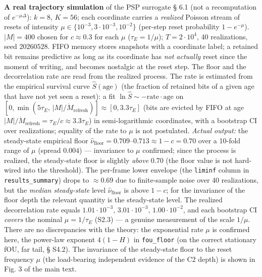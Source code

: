 \documentclass[12pt]{iopart}
\begin{document}
\textbf{A real trajectory simulation} of the PSP surrogate \cite{Andriishin2026b} § 6.1 (not a recomputation of \(e^{-\mu\Delta}\)): \(k = 8\), \(K = 56\); each coordinate carries a \emph{realized} Poisson stream of resets of intensity \(\mu \in \{10^{-3}, 3\cdot10^{-3}, 10^{-2}\}\) (per-step reset probability \(1 - e^{-\mu}\)). \(|M| = 400\) chosen for \(c \approx 0.3\) for each \(\mu\) (\(\tau_E = 1/\mu\)); \(T = 2\cdot10^4\), 40 realizations, seed \(20260528\). FIFO memory stores snapshots with a coordinate label; a retained bit remains predictive as long as its coordinate has \emph{not actually} reset since the moment of writing, and becomes nostalgic at the reset step. The floor and the decorrelation rate are read from the realized process. The rate is estimated from the empirical survival curve \(\hat S(\text{age})\) (the fraction of retained bits of a given age that have not yet seen a reset): a fit \(\ln\hat S \sim -\text{rate}\cdot\text{age}\) on \([0, \min(5\tau_E,\,|M|/\dot M_{\text{refresh}})] \approx [0, 3.3\tau_E]\) (bits are evicted by FIFO at age \(|M|/\dot M_{\text{refresh}} = \tau_E/c \approx 3.3\tau_E\)) in semi-logarithmic coordinates, with a bootstrap CI over realizations; equality of the rate to \(\mu\) is not postulated. \emph{Actual output:} the steady-state empirical floor \(\hat\nu_{\text{floor}} = 0.709\text{–}0.713 \approx 1-c = 0.70\) over a 10-fold range of \(\mu\) (spread \(0.004\)) --- invariance to \(\mu\) confirmed; since the process is realized, the steady-state floor is slightly \emph{above} \(0.70\) (the floor value is not hard-wired into the threshold). The per-frame lower envelope (the \texttt{liminf} column in \texttt{results\_summary}) drops to \(\approx0.69\) due to finite-sample noise over 40 realizations, but the \emph{median steady-state} level \(\hat\nu_{\text{floor}}\) is above \(1-c\); for the invariance of the floor depth the relevant quantity is the steady-state level. The realized decorrelation rate equals \(1.01\cdot10^{-3},\,3.01\cdot10^{-3},\,1.00\cdot10^{-2}\), and each bootstrap CI \emph{covers} the nominal \(\mu = 1/\tau_E\) (S2.3) --- a genuine measurement of the scale \(1/\mu\). There are no discrepancies with the theory: the exponential rate \(\mu\) is confirmed here, the power-law exponent \(4(1-H)\) in \texttt{fou\_floor} (on the correct stationary fOU, far tail, § S4.2). The invariance of the steady-state floor to the reset frequency \(\mu\) (the load-bearing independent evidence of the C2 depth) is shown in Fig. 3 of the main text.
\end{document}
